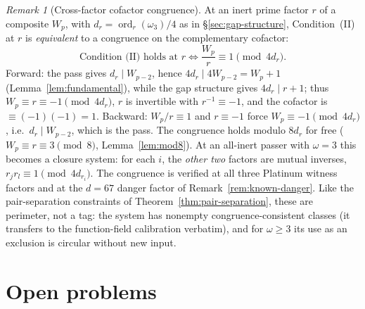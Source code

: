 \documentclass[11pt]{amsart}
\theoremstyle{plain}
\theoremstyle{definition}
\theoremstyle{remark}
\newtheorem{remark}[theorem]{Remark}
\numberwithin{equation}{section}
\newcommand{\ord}{\operatorname{ord}}
\begin{document}
\begin{remark}[Cross-factor cofactor congruence]\label{rem:cofactor-congruence}
At an inert prime factor $r$ of a composite $W_p$, with $d_r = \ord_r(\omega_3)/4$ as in \S\ref{sec:gap-structure}, Condition~(II) at $r$ is \emph{equivalent} to a congruence on the complementary cofactor:
\[
  \text{Condition~(II) holds at } r
  \iff
  \frac{W_p}{r} \equiv 1 \pmod{4 d_r}.
\]
Forward: the pass gives $d_r \mid W_{p-2}$, hence $4 d_r \mid 4 W_{p-2} = W_p + 1$ (Lemma~\ref{lem:fundamental}), while the gap structure gives $4 d_r \mid r + 1$; thus $W_p \equiv r \equiv -1 \pmod{4 d_r}$, $r$ is invertible with $r^{-1} \equiv -1$, and the cofactor is $\equiv (-1)(-1) = 1$. Backward: $W_p/r \equiv 1$ and $r \equiv -1$ force $W_p \equiv -1 \pmod{4 d_r}$, i.e.\ $d_r \mid W_{p-2}$, which is the pass. The congruence holds modulo $8 d_r$ for free ($W_p \equiv r \equiv 3 \pmod 8$, Lemma~\ref{lem:mod8}). At an all-inert passer with $\omega = 3$ this becomes a closure system: for each $i$, the \emph{other two} factors are mutual inverses, $r_j r_l \equiv 1 \pmod{4 d_{r_i}}$. The congruence is verified at all three Platinum witness factors and at the $d = 67$ danger factor of Remark~\ref{rem:known-danger}. Like the pair-separation constraints of Theorem~\ref{thm:pair-separation}, these are perimeter, not a tag: the system has nonempty congruence-consistent classes (it transfers to the function-field calibration verbatim), and for $\omega \geq 3$ its use as an exclusion is circular without new input.
\end{remark}

\section{Open problems}\label{sec:open-problems}
\end{document}

